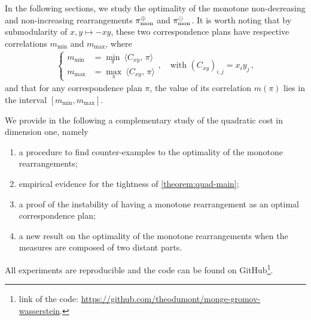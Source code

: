             In the following sections, we study the optimality of the monotone non-decreasing and non-increasing rearrangements $\pi_\text{mon}^\oplus$ and $\pi_\text{mon}^\ominus$. It is worth noting that by submodularity of $x,y\mapsto -xy$, these two correspondence plans have respective correlations $m_\text{min}$ and $m_\text{max}$, where
                    \begin{align}
                        \label{eq:m-min-max}
                        \begin{cases}
                            m_\text{min}&= \min_{\pi}\ \langle C_{xy},\, \pi\rangle\\
                            m_\text{max}&= \max_{\pi}\ \langle C_{xy},\, \pi\rangle
                        \end{cases},\quad\text{with }(C_{xy})_{i,j}=x_iy_j\,,
                    \end{align}
            and that for any correspondence plan $\pi$, the value of its correlation $m(\pi)$ lies in the interval $[m_\text{min},m_\text{max}]$.

            \noindent We provide in the following a complementary study of the quadratic cost in dimension one, namely
            \begin{enumerate}[label=(\roman*),nolistsep]
                \item a procedure to find counter-examples to the optimality of the monotone rearrangements;
                \item empirical evidence for the tightness of \cref{theorem:quad-main};
                \item a proof of the instability of having a monotone rearrangement as an optimal correspondence plan;
                \item a new result on the optimality of the monotone rearrangements when the measures are composed of two distant parts.
            \end{enumerate}
            All experiments are reproducible and the code can be found on GitHub\footnote{link of the code: \href{https://github.com/theodumont/monge-gromov-wasserstein}{https://github.com/theodumont/monge-gromov-wasserstein}.}.
